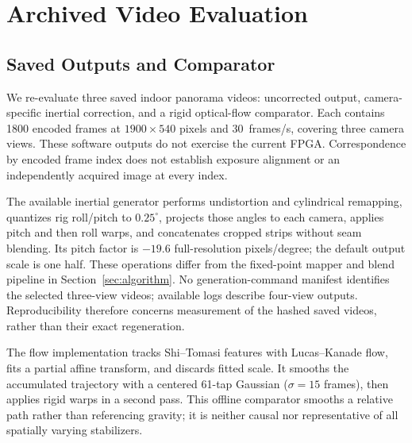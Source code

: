 \section{Archived Video Evaluation}
\label{sec:video-evaluation}
\subsection{Saved Outputs and Comparator}
We re-evaluate three saved indoor panorama videos: uncorrected output,
camera-specific inertial correction, and a rigid optical-flow comparator.
Each contains 1800 encoded frames at $1900\times540$ pixels and 30~frames/s,
covering three camera views. These software outputs do not exercise the
current FPGA. Correspondence by encoded frame index does not establish
exposure alignment or an independently acquired image at every index.

The available inertial generator performs undistortion and cylindrical
remapping, quantizes rig roll/pitch to $0.25^\circ$, projects those angles to
each camera, applies pitch and then roll warps, and concatenates cropped
strips without seam blending. Its pitch factor is $-19.6$ full-resolution
pixels/degree; the default output scale is one half. These operations differ
from the fixed-point mapper and blend pipeline in Section~\ref{sec:algorithm}.
No generation-command manifest identifies the selected three-view videos;
available logs describe four-view outputs. Reproducibility therefore concerns
measurement of the hashed saved videos, rather than their exact regeneration.

The flow implementation tracks Shi--Tomasi features with Lucas--Kanade flow,
fits a partial affine transform, and discards fitted scale. It smooths the
accumulated trajectory with a centered 61-tap Gaussian ($\sigma=15$ frames),
then applies rigid warps in a second pass. This offline comparator smooths a
relative path rather than referencing gravity; it is neither causal nor
representative of all spatially varying stabilizers.

